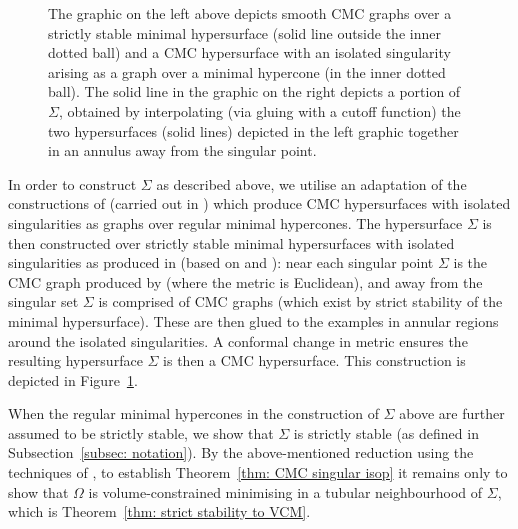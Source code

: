 \documentclass[12pt]{article}
\begin{document}
\begin{figure}[H]
    \caption{The graphic on the left above depicts smooth CMC graphs over a strictly stable minimal hypersurface (solid line outside the inner dotted ball) and a CMC hypersurface with an isolated singularity arising as a graph over a minimal hypercone (in the inner dotted ball). The solid line in the graphic on the right depicts a portion of $\Sigma$, obtained by interpolating (via gluing with a cutoff function) the two hypersurfaces (solid lines) depicted in the left graphic together in an annulus away from the singular point.}
    \label{fig: gluings}
\end{figure}

In order to construct $\Sigma$ as described above, we utilise an adaptation of the constructions of \cite{CHS84} (carried out in \cite{I17}) which produce CMC hypersurfaces with isolated singularities as graphs over regular minimal hypercones. The hypersurface $\Sigma$ is then constructed over strictly stable minimal hypersurfaces with isolated singularities as produced in \cite[Theorem 3]{MN26} (based on \cite{S99} and \cite{S00}): near each singular point $\Sigma$ is the CMC graph produced by \cite{CHS84} (where the metric is Euclidean), and away from the singular set $\Sigma$ is comprised of CMC graphs (which exist by strict stability of the minimal hypersurface). These are then glued to the \cite{CHS84} examples in annular regions around the isolated singularities. A conformal change in metric ensures the resulting hypersurface $\Sigma$ is then a CMC hypersurface. This construction is depicted in Figure~\ref{fig: gluings}. 

\bigskip

When the regular minimal hypercones in the construction of $\Sigma$ above are further assumed to be strictly stable, we show that $\Sigma$ is strictly stable (as defined in Subsection~\ref{subsec: notation}). By the above-mentioned reduction using the techniques of \cite{MN26}, to establish Theorem~\ref{thm: CMC singular isop} it remains only to show that $\Omega$ is volume-constrained minimising in a tubular neighbourhood of $\Sigma$, which is Theorem~\ref{thm: strict stability to VCM}.

\bigskip
\end{document}
